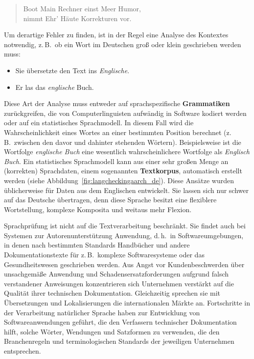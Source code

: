 \begin{multicols}{2}
\begin{quote}
Boot Main Rechner einst Meer Humor,\\
nimmt Ehr' Häute Korrekturen vor.
\end{quote}

Um derartige Fehler zu finden, ist in der Regel eine Analyse des Kontextes notwendig, z.\,B.~ob ein Wort im Deutschen groß oder klein geschrieben werden muss:

\begin{itemize}
\item Sie übersetzte den Text ins \textit{Englische}.
\item Er las das \textit{englische} Buch.
\end{itemize}

Diese Art der Analyse muss entweder auf sprachspezifische \textbf{Grammatiken} zurückgreifen, die von Computerlinguisten aufwändig in Software kodiert werden oder auf ein statistisches Sprachmodell. In diesem Fall wird die Wahrscheinlichkeit eines Wortes an einer bestimmten Position berechnet (z.\,B.~zwischen den davor und dahinter stehenden Wörtern). Beispielsweise ist die Wortfolge \textit{englische Buch} eine wesentlich wahrscheinlichere Wortfolge als \textit{Englisch Buch}. Ein statistisches Sprachmodell kann aus einer sehr großen Menge an (korrekten) Sprachdaten, einem sogenannten \textbf{Textkorpus}, automatisch erstellt werden (siehe Abbildung~\ref{fig:langcheckingaarch_de}). Diese Ansätze wurden üblicherweise für Daten aus dem Englischen entwickelt. Sie lassen sich nur schwer auf das Deutsche übertragen, 
denn diese Sprache besitzt eine flexiblere Wortstellung, komplexe Komposita und weitaus mehr Flexion.

Sprachprüfung ist nicht auf die Textverarbeitung beschränkt. Sie findet auch bei Systemen zur Autorenunterstützung Anwendung, d.\,h.~in Softwareumgebungen, in denen nach bestimmten Standards Handbücher und andere Dokumentationstexte für z.\,B.~komplexe Softwaresysteme oder das Gesundheitswesen geschrieben werden. Aus Angst vor Kundenbeschwerden über unsachgemäße Anwendung und Schadensersatzforderungen aufgrund falsch verstandener Anweisungen konzentrieren sich Unternehmen verstärkt auf die Qualität ihrer technischen Dokumentation. 
Gleichzeitig sprechen sie mit Übersetzungen und Lokalisierungen die internationalen Märkte an. Fortschritte in der Verarbeitung natürlicher Sprache haben zur Entwicklung 
von Softwareanwendungen geführt, die den Verfassern technischer Dokumentation hilft, solche Wörter, Wendungen und Satzformen zu verwenden, die den Branchenregeln und terminologischen Standards der jeweiligen Unternehmen entsprechen. 


\end{multicols}
